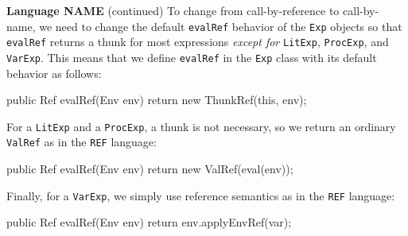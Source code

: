 \begin{minipage}[t]{\sw}
\slidenumber
\LARGE
{\bf Language NAME} (continued)\exx
To change from call-by-reference to call-by-name,
we need to change the default \verb'evalRef' behavior
of the \verb'Exp' objects
so that \verb'evalRef' returns a thunk
for most expressions {\em except for}
\verb'LitExp', \verb'ProcExp', and \verb'VarExp'.
This means that we define \verb'evalRef'
in the \verb'Exp' class with its default behavior as follows:
{\Large
\begin{qv}
public Ref evalRef(Env env) {
    return new ThunkRef(this, env);
}
\end{qv}
}
For a \verb'LitExp' and a \verb'ProcExp',
a thunk is not necessary,
so we return an ordinary \verb'ValRef' as in the \verb'REF' language:
{\Large
\begin{qv}
public Ref evalRef(Env env) {
    return new ValRef(eval(env));
}
\end{qv}
}
Finally, for a \verb'VarExp', we simply use reference semantics
as in the \verb'REF' language:
{\Large
\begin{qv}
public Ref evalRef(Env env) {
    return env.applyEnvRef(var);
}
\end{qv}
}
\end{minipage}
\clearpage
